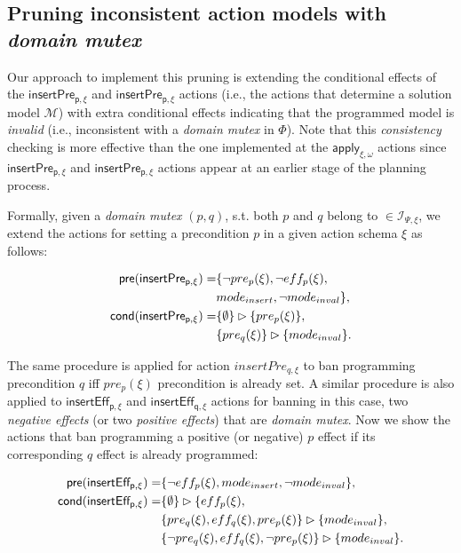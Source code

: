 \documentclass{article}
\newcommand{\pre}{\mathsf{pre}}     %
\newcommand{\cond}{\mathsf{cond}}   %
\begin{document}
\subsection{Pruning inconsistent action models with {\em domain mutex}}
Our approach to implement this pruning is extending the conditional effects of the $\mathsf{insertPre_{p,\xi}}$ and $\mathsf{insertPre_{p,\xi}}$ actions (i.e., the actions that determine a solution model $\mathcal{M}$) with extra conditional effects indicating that the programmed model is {\em invalid} (i.e., inconsistent with a {\em domain mutex} in $\Phi$). Note that this {\em consistency} checking is more effective than the one implemented at the $\mathsf{apply_{\xi,\omega}}$ actions since $\mathsf{insertPre_{p,\xi}}$ and $\mathsf{insertPre_{p,\xi}}$ actions appear at an earlier stage of the planning process.

Formally, given a {\em domain mutex} $(p,q)$, s.t. both $p$ and $q$ belong to $\in{\mathcal I}_{\Psi,\xi}$, we extend the actions for setting a precondition $p$ in a given action schema $\xi$ as follows:

\begin{small}
\begin{align*}
\hspace*{7pt}\pre(\mathsf{insertPre_{p,\xi}})=&\{\neg pre_{p}(\xi), \neg eff_{p}(\xi),\\
&mode_{insert},\neg mode_{inval}\},\\
\cond(\mathsf{insertPre_{p,\xi}})=&\{\emptyset\}\rhd\{pre_{p}(\xi)\},\\
&\{pre_{q}(\xi)\}\rhd\{mode_{inval}\}.
\end{align*}
\end{small}
The same procedure is applied for action $insertPre_{q,\xi}$ to ban programming precondition $q$ iff $pre_{p}(\xi)$ precondition is already set. A similar procedure is also applied to $\mathsf{insertEff_{p,\xi}}$ and $\mathsf{insertEff_{q,\xi}}$ actions for banning in this case, two {\em negative effects} (or two {\em positive effects}) that are {\em domain mutex}. Now we show the actions that ban programming a positive (or negative) $p$ effect if its corresponding $q$ effect is already programmed:

\begin{small}
\begin{align*}
\hspace*{7pt}\pre(\mathsf{insertEff_{p,\xi}})=&\{\neg eff_{p}(\xi), mode_{insert},\neg mode_{inval}\},\\
\cond(\mathsf{insertEff_{p,\xi}})=&\{\emptyset\}\rhd\{eff_{p}(\xi),\\
&\{pre_{q}(\xi),eff_{q}(\xi),pre_{p}(\xi)\}\rhd\{mode_{inval}\},\\
&\{\neg pre_{q}(\xi),eff_{q}(\xi),\neg pre_{p}(\xi)\}\rhd\{mode_{inval}\}.
\end{align*}
\end{small}
\end{document}
